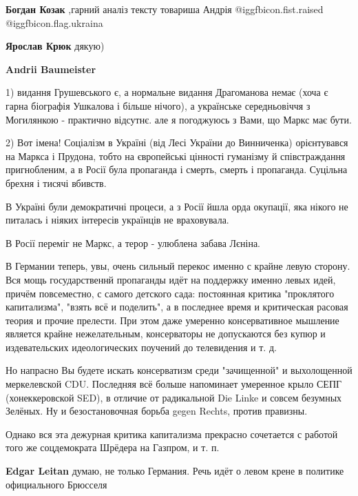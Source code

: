 \begin{itemize}
\begin{itemize}
\textbf{Богдан Козак} ,гарний аналіз тексту товариша Андрія  @igg{fbicon.fist.raised}  @igg{fbicon.flag.ukraina}

\textbf{Ярослав Крюк} дякую)

\textbf{Andrii Baumeister} 

1) видання Грушевського є, а нормальне видання Драгоманова немає (хоча є гарна
біографія Ушкалова і більше нічого), а українське середньовіччя з Могилянкою -
практично відсутнє. але я погоджуюсь з Вами, що Маркс має бути.

2) Вот імена! Соціалізм в Україні (від Лесі України до Винниченка) орієнтувався
на Маркса і Прудона, тобто на європейські цінності гуманізму й співстраждання
пригнобленим, а в Росії була пропаганда і смерть, смерть і пропаганда. Суцільна
брехня і тисячі вбивств.

В Україні були демократичні процеси, а з Росії йшла орда окупації, яка нікого
не питалась і ніяких інтересів українців не враховувала.

В Росії переміг не Маркс, а терор - улюблена забава Лєніна.

\end{itemize} %


В Германии теперь, увы, очень сильный перекос именно с крайне левую сторону.
Вся мощь государственнй пропаганды идёт на поддержку именно левых идей, причём
повсеместно, с самого детского сада: постоянная критика "проклятого
капитализма", "взять всё и поделить", а в последнее время и критическая расовая
теория и прочие прелести. При этом даже умеренно консервативное мышление
является крайне нежелательным, консерваторы не допускаются без купюр и
издевательских идеологических поучений до телевидения и т. д.

Но напрасно Вы будете искать консерватизм среди "зачищенной" и выхолощенной
меркелевской CDU. Последняя всё больше напоминает умеренное крыло СЕПГ
(хонеккеровской SED), в отличие от радикальной Die Linke и совсем безумных
Зелёных. Ну и безостановочная борьба gegen Rechts, против правизны.

Однако вся эта дежурная критика капитализма прекрасно сочетается с работой того
же соцдемократа Шрёдера на Газпром, и т. п.

\begin{itemize} %
\textbf{Edgar Leitan} думаю, не только Германия. Речь идёт о левом крене в политике официального Брюсселя


\end{itemize}
\end{itemize}
